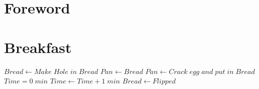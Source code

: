 \documentclass[oneside]{recipe}
\begin{document}
\tableofcontents
\chapter{Foreword}

\chapter{Breakfast}


\begin{algorithmic}[0]
   \State $Bread \gets Make\; Hole\; in\; Bread$
   \State $Pan \gets Bread$
   \State $Pan \gets Crack\;egg\;and\;put\;in\;Bread$
   \Repeat
	   \State $Time = 0\; min$
	   		\State $Time \gets Time + 1\;min$
	   \EndWhile\label{euclidendwhile}
	   \State $Bread \gets Flipped$
\EndProcedure
\end{algorithmic}
\end{document}
